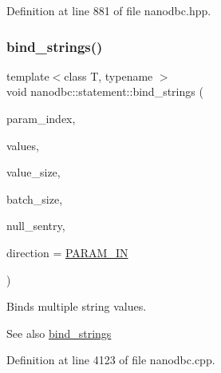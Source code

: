 Definition at line 881 of file nanodbc.\+hpp.

\mbox{\label{group__bind__strings_gaab3ea540d9998532141d11970107767d}} 
\subsubsection{\texorpdfstring{bind\_strings()}{bind\_strings()}\hspace{0.1cm}{\footnotesize\ttfamily [4/9]}}
{\footnotesize\ttfamily template$<$class T, typename $>$ \\
void nanodbc\+::statement\+::bind\+\_\+strings (\begin{DoxyParamCaption}\item[{short}]{param\+\_\+index,  }\item[{T const $\ast$}]{values,  }\item[{std\+::size\+\_\+t}]{value\+\_\+size,  }\item[{std\+::size\+\_\+t}]{batch\+\_\+size,  }\item[{T const $\ast$}]{null\+\_\+sentry,  }\item[{\mbox{\hyperlink{classnanodbc_1_1statement_a523142f53cbbee8d68a074da993e7fa6}{param\+\_\+direction}}}]{direction = {\ttfamily \mbox{\hyperlink{classnanodbc_1_1statement_a523142f53cbbee8d68a074da993e7fa6ae33f42ce0677d00c291ff4d8e39f99de}{P\+A\+R\+A\+M\+\_\+\+IN}}} }\end{DoxyParamCaption})}



Binds multiple string values. 

\begin{DoxySeeAlso}{See also}
\mbox{\hyperlink{group__bind__strings_ga8914c229f28ee7b02cf1b85684741326}{bind\+\_\+strings}} 
\end{DoxySeeAlso}


Definition at line 4123 of file nanodbc.\+cpp.

\mbox{\label{group__bind__strings_gab3fcf94cac28bc25a794c3cd9b9cf47c}} 
